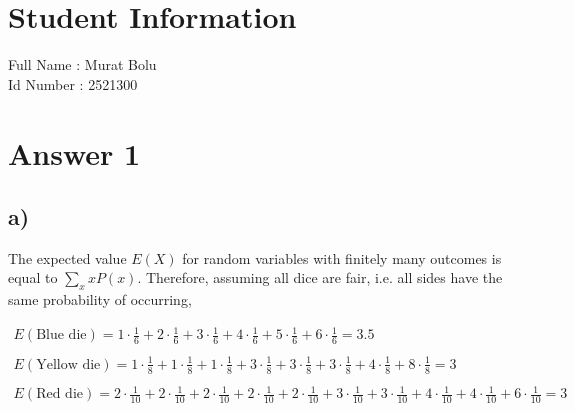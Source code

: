 \documentclass[12pt]{article}
\begin{document}
\section*{Student Information } 
Full Name : Murat Bolu \\
Id Number : 2521300 \\

\section*{Answer 1}

\subsection*{a)} 

The expected value $E(X)$ for random variables with finitely many outcomes is
equal to $\displaystyle\sum_{x}^{}xP(x)$.
Therefore, assuming all dice are fair, i.e. all sides have the same probability
of occurring,

\begin{gather*}
    E(\text{Blue die}) = 1 \cdot \tfrac{1}{6}
                       + 2 \cdot \tfrac{1}{6}
                       + 3 \cdot \tfrac{1}{6}
                       + 4 \cdot \tfrac{1}{6}
                       + 5 \cdot \tfrac{1}{6}
                       + 6 \cdot \tfrac{1}{6} = 3.5 \\
    \\
    E(\text{Yellow die}) = 1 \cdot \tfrac{1}{8}
                         + 1 \cdot \tfrac{1}{8}
                         + 1 \cdot \tfrac{1}{8}
                         + 3 \cdot \tfrac{1}{8}
                         + 3 \cdot \tfrac{1}{8}
                         + 3 \cdot \tfrac{1}{8}
                         + 4 \cdot \tfrac{1}{8}
                         + 8 \cdot \tfrac{1}{8} = 3 \\
    \\
    E(\text{Red die}) = 2 \cdot \tfrac{1}{10}
                      + 2 \cdot \tfrac{1}{10}
                      + 2 \cdot \tfrac{1}{10}
                      + 2 \cdot \tfrac{1}{10}
                      + 2 \cdot \tfrac{1}{10}
                      + 3 \cdot \tfrac{1}{10}
                      + 3 \cdot \tfrac{1}{10}
                      + 4 \cdot \tfrac{1}{10}
                      + 4 \cdot \tfrac{1}{10}
                      + 6 \cdot \tfrac{1}{10} = 3
\end{gather*}
\end{document}
